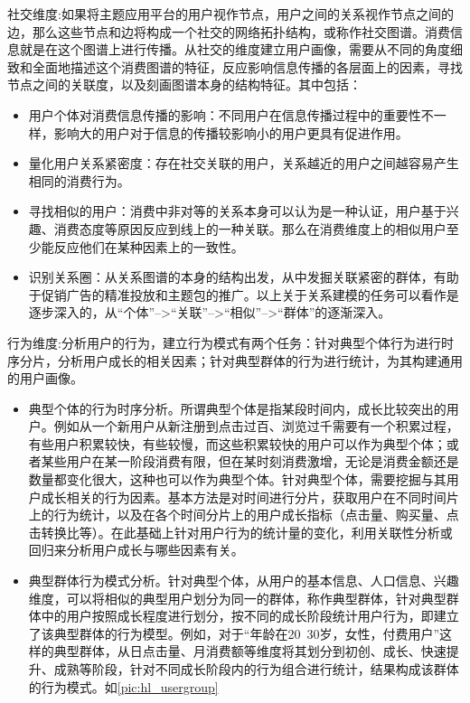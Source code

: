         社交维度:如果将主题应用平台的用户视作节点，用户之间的关系视作节点之间的边，那么这些节点和边将构成一个社交的网络拓扑结构，或称作社交图谱。消费信息就是在这个图谱上进行传播。从社交的维度建立用户画像，需要从不同的角度细致和全面地描述这个消费图谱的特征，反应影响信息传播的各层面上的因素，寻找节点之间的关联度，以及刻画图谱本身的结构特征。其中包括：
        \begin{itemize}
        \item 用户个体对消费信息传播的影响：不同用户在信息传播过程中的重要性不一样，影响大的用户对于信息的传播较影响小的用户更具有促进作用。
        \item 量化用户关系紧密度：存在社交关联的用户，关系越近的用户之间越容易产生相同的消费行为。
        \item 寻找相似的用户：消费中非对等的关系本身可以认为是一种认证，用户基于兴趣、消费态度等原因反应到线上的一种关联。那么在消费维度上的相似用户至少能反应他们在某种因素上的一致性。
        \item 识别关系圈：从关系图谱的本身的结构出发，从中发掘关联紧密的群体，有助于促销广告的精准投放和主题包的推广。以上关于关系建模的任务可以看作是逐步深入的，从“个体”-->“关联”-->“相似”-->“群体”的逐渐深入。
        \end{itemize}

        行为维度:分析用户的行为，建立行为模式有两个任务：针对典型个体行为进行时序分片，分析用户成长的相关因素；针对典型群体的行为进行统计，为其构建通用的用户画像。
        \begin{itemize}
        \item 典型个体的行为时序分析。所谓典型个体是指某段时间内，成长比较突出的用户。例如从一个新用户从新注册到点击过百、浏览过千需要有一个积累过程，有些用户积累较快，有些较慢，而这些积累较快的用户可以作为典型个体；或者某些用户在某一阶段消费有限，但在某时刻消费激增，无论是消费金额还是数量都变化很大，这种也可以作为典型个体。针对典型个体，需要挖掘与其用户成长相关的行为因素。基本方法是对时间进行分片，获取用户在不同时间片上的行为统计，以及在各个时间分片上的用户成长指标（点击量、购买量、点击转换比等）。在此基础上针对用户行为的统计量的变化，利用关联性分析或回归来分析用户成长与哪些因素有关。
        \item 典型群体行为模式分析。针对典型个体，从用户的基本信息、人口信息、兴趣维度，可以将相似的典型用户划分为同一的群体，称作典型群体，针对典型群体中的用户按照成长程度进行划分，按不同的成长阶段统计用户行为，即建立了该典型群体的行为模型。例如，对于“年龄在20~30岁，女性，付费用户”这样的典型群体，从日点击量、月消费额等维度将其划分到初创、成长、快速提升、成熟等阶段，针对不同成长阶段内的行为组合进行统计，结果构成该群体的行为模式。如\autoref{pic:hl_usergroup}
        \end{itemize}


